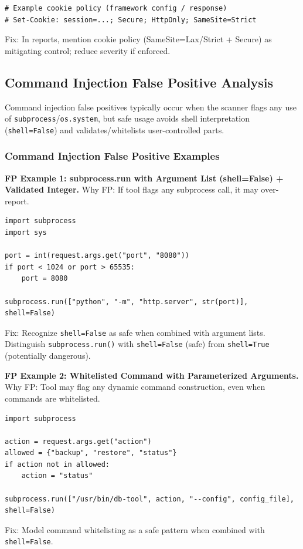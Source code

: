 \begin{lstlisting}[basicstyle=\ttfamily\small, frame=single]
# Example cookie policy (framework config / response)
# Set-Cookie: session=...; Secure; HttpOnly; SameSite=Strict
\end{lstlisting}
Fix: In reports, mention cookie policy (SameSite=Lax/Strict + Secure) as mitigating control; reduce severity if enforced.

\subsection{Command Injection False Positive Analysis}
\label{sec:fp_cmd}

Command injection false positives typically occur when the scanner flags any use of \texttt{subprocess}/\texttt{os.system}, but safe usage avoids shell interpretation (\texttt{shell=False}) and validates/whitelists user-controlled parts.

\subsubsection{Command Injection False Positive Examples}
\label{sec:fp_cmd_examples}

\textbf{FP Example 1: subprocess.run with Argument List (shell=False) + Validated Integer.} Why FP: If tool flags any subprocess call, it may over-report.

\begin{lstlisting}[style=pycode]
import subprocess
import sys

port = int(request.args.get("port", "8080"))
if port < 1024 or port > 65535:
    port = 8080

subprocess.run(["python", "-m", "http.server", str(port)], shell=False)
\end{lstlisting}
Fix: Recognize \texttt{shell=False} as safe when combined with argument lists. Distinguish \texttt{subprocess.run()} with \texttt{shell=False} (safe) from \texttt{shell=True} (potentially dangerous).

\textbf{FP Example 2: Whitelisted Command with Parameterized Arguments.} Why FP: Tool may flag any dynamic command construction, even when commands are whitelisted.

\begin{lstlisting}[style=pycode]
import subprocess

action = request.args.get("action")
allowed = {"backup", "restore", "status"}
if action not in allowed:
    action = "status"

subprocess.run(["/usr/bin/db-tool", action, "--config", config_file], shell=False)
\end{lstlisting}
Fix: Model command whitelisting as a safe pattern when combined with \texttt{shell=False}.

